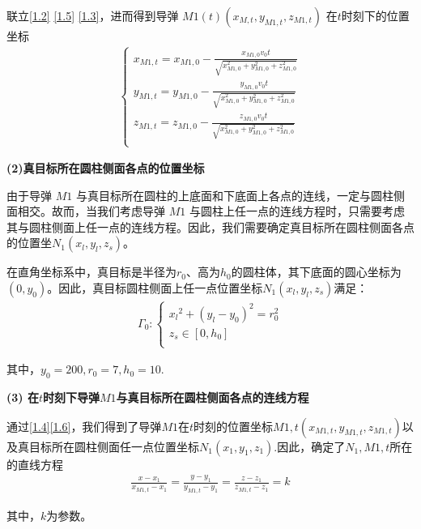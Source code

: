 \documentclass[../main.tex]{subfiles}
\begin{document}
\par 联立\eqref{1.2} \eqref{1.5} \eqref{1.3}，进而得到导弹 \( M1(t)(x_{M,t}, y_{M1,t}, z_{M1,t}) \) 在$t$时刻下的位置坐标
\begin{align}\label{1.4}
\left\{ \begin{array}{l}
x_{M1,t}=x_{M1,0}-\frac{x_{M1,0}v_0t}{\sqrt{x_{M1,0}^{2}+y_{M1,0}^{2}+z_{M1,0}^{2}}}\\
y_{M1,t}=y_{M1,0}-\frac{y_{M1,0}v_0t}{\sqrt{x_{M1,0}^{2}+y_{M1,0}^{2}+z_{M1,0}^{2}}}\\
z_{M1,t}=z_{M1,0}-\frac{z_{M1,0}v_0t}{\sqrt{x_{M1,0}^{2}+y_{M1,0}^{2}+z_{M1,0}^{2}}}\\
\end{array} \right. 
\end{align}


\noindent\textbf{(2)真目标所在圆柱侧面各点的位置坐标}
\par 由于导弹 \( M1 \) 与真目标所在圆柱的上底面和下底面上各点的连线，一定与圆柱侧面相交。故而，当我们考虑导弹 \( M1 \) 与圆柱上任一点的连线方程时，只需要考虑其与圆柱侧面上任一点的连线方程。因此，我们需要确定真目标所在圆柱侧面各点的位置坐$N_1\left( x_l,y_l,z_s \right) $。
\par 在直角坐标系中，真目标是半径为$r_0$、高为$h_0$的圆柱体，其下底面的圆心坐标为$\left( 0,y_0 \right)$。因此，真目标圆柱侧面上任一点位置坐标$N_1\left( x_l,y_l,z_s \right) $满足：
\begin{align}\label{1.6}
\varGamma _0:\begin{cases}
{x_l}^2+\left( y_l-y_0 \right) ^2=r_{0}^{2}\\
z_s\in \left[ 0,h_0 \right]\\
\end{cases}
\end{align}
\par 其中，$y_0=200,r_0=7,h_0=10$.




\noindent\textbf{(3) 在\( t \)时刻下导弹\( M1 \)与真目标所在圆柱侧面各点的连线方程}
\par 通过\eqref{1.4}\eqref{1.6}，我们得到了导弹$M1$在\( t \)时刻的位置坐标\( M1,t(x_{M1,t}, y_{M1,t}, z_{M1,t}) \)以及真目标所在圆柱侧面任一点位置坐标$N_1\left( x_1,y_1,z_1 \right) $.因此，确定了$N_1,M1,t$所在的直线方程
\begin{align}\label{1.7}
\frac{x-x_1}{x_{M1,t}-x_1}=\frac{y-y_1}{y_{M1,t}-y_1}=\frac{z-z_1}{z_{M1,t}-z_1}=k 
\end{align}
\par 其中，$k$为参数。
\end{document}
